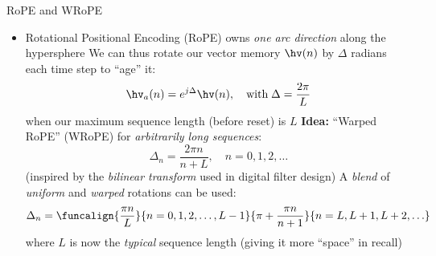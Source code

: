 \begin{slide}[\slideopts,toc={WRoPE}]{RoPE and WRoPE}

\vspace{-1em}

\begin{itemize}
\item Rotational Positional Encoding (RoPE) owns \emph{one arc direction} along the hypersphere %
  \mpitem We can thus rotate our vector memory $\hv(n)$ by $\Delta$ radians each time step to ``age'' it:
  \[
  \hv_a(n) = e^{j\Delta}\hv(n), \quad \mbox{with}\; \Delta = \frac{2\pi}{L}
  \]
  when our maximum sequence length (before reset) is $L$
  \mpitem \textbf{Idea:} ``Warped RoPE'' (WRoPE) for \emph{arbitrarily long sequences}:
  \[
  \Delta_n = \frac{2\pi n}{n+L}, \quad n=0,1,2,\ldots
  \]
  \maybepause
  (inspired by the \emph{bilinear transform} used in digital filter design)
  \mpitem A \emph{blend} of \emph{uniform} and \emph{warped} rotations can be used:
  \[
  \Delta_n = \funcalign{\frac{\pi n}{L}}{n=0,1,2,\ldots,L-1}{%
    \pi + \frac{\pi n}{n+1}}{n=L,L+1,L+2,\ldots}
  \]
  where $L$ is now the \emph{typical} sequence length (giving it more ``space'' in recall)
\end{itemize}
\end{slide}

